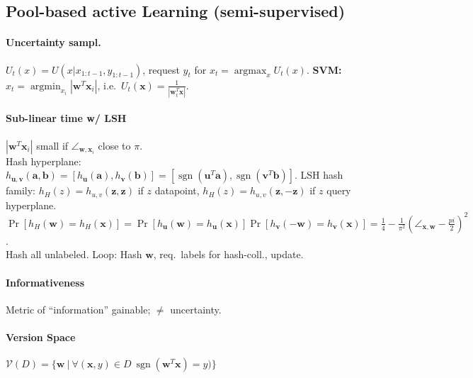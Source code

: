\documentclass[10pt]{scrartcl}
\DeclareMathOperator{\sign}{sgn}
\DeclareMathOperator{\argmin}{argmin}
\DeclareMathOperator{\argmax}{argmax}
\begin{document}
\begin{multicols}{3}
\section{Pool-based active Learning (semi-supervised)}

\paragraph{Uncertainty sampl.}
$U_t(x) = U(x | x_{1:t-1}, y_{1:t-1})$, request $y_t$ for $x_t = \argmax_x U_t(x)$.
\textbf{SVM:} $x_t = \argmin_{x_i}|\bm w^T\bm x_i|$, i.e.\ $U_t(\bm x) = \frac{1}{|\bm w_t^T \bm x|}$.

\paragraph{Sub-linear time w/ LSH}
$|\bm w^T\bm x_i|$ small if $\angle_{\bm w,\bm x_i}$ close to $\pi$.\\
Hash hyperplane:
$h_{\bm u,\bm v}(\bm a,\bm b) = [h_{\bm u}(\bm a), h_{\bm v}(\bm b)] = [\sign(\bm u^T\bm a),\sign(\bm v^T\bm b)]$.
LSH hash family: $h_H(z) = h_{u,v}(\bm z,\bm z)$ if $z$ datapoint, $h_H(z) = h_{u,v}(\bm z,-\bm z)$ if $z$ query hyperplane.
$\Pr[h_H(\bm w) = h_H(\bm x)] = \Pr[h_{\bm u}(\bm w) = h_{\bm u}(\bm x)]\Pr[h_{\bm v}(-\bm w) = h_{\bm v}(\bm x)] = \frac{1}{4} - \frac{1}{\pi^2}(\angle_{\bm x,\bm w} - \frac{pi}{2})^2$.\\
Hash all unlabeled. Loop: Hash $\bm w$, req.\ labels for hash-coll., update.

\paragraph{Informativeness}
Metric of “information” gainable; $\neq$ uncertainty.
\paragraph{Version Space}
$\mathcal{V}(D) = \{\bm w\ |\ \forall(\bm x,y)\in D\ \sign(\bm w^T\bm x) = y)\}$


\end{multicols}
\end{document}
